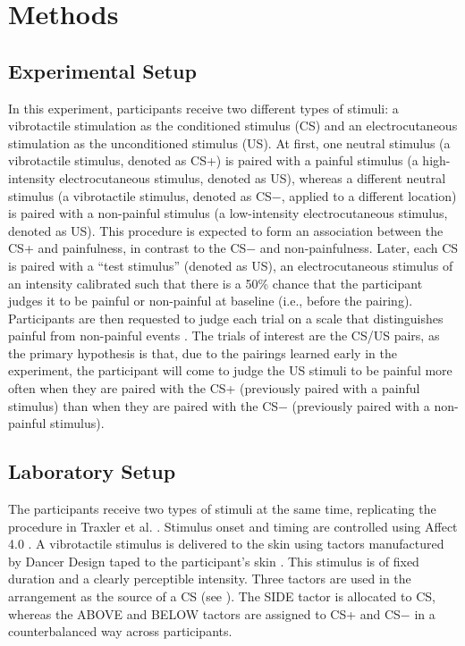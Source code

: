 \documentclass{jote-article}
\begin{document}
\section{Methods}

\subsection{Experimental Setup}

In this experiment, participants receive two different types of stimuli: a vibrotactile stimulation as the conditioned stimulus (CS) and an electrocutaneous stimulation as the unconditioned stimulus (US). At first, one neutral stimulus (a vibrotactile stimulus, denoted as CS+) is paired with a painful stimulus (a high-intensity electrocutaneous stimulus, denoted as US), whereas a different neutral stimulus (a vibrotactile stimulus, denoted as CS−, applied to a different location) is paired with a non-painful stimulus (a low-intensity electrocutaneous stimulus, denoted as US). This procedure is expected to form an association between the CS+ and painfulness, in contrast to the CS− and non-painfulness. Later, each CS is paired with a “test stimulus” (denoted as US), an electrocutaneous stimulus of an intensity calibrated such that there is a 50\% chance that the participant judges it to be painful or non-painful at baseline (i.e., before the pairing). Participants are then requested to judge each trial on a scale that distinguishes painful from non-painful events \cite{bibr40}. The trials of interest are the CS/US pairs, as the primary hypothesis is that, due to the pairings learned early in the experiment, the participant will come to judge the US stimuli to be painful more often when they are paired with the CS+ (previously paired with a painful stimulus) than when they are paired with the CS− (previously paired with a non-painful stimulus).

\subsection{Laboratory Setup}

The participants receive two types of stimuli at the same time, replicating the procedure in Traxler et al. \cite{bibr7}. Stimulus onset and timing are controlled using Affect 4.0 \cite{bibr41}. A vibrotactile stimulus is delivered to the skin using tactors manufactured by Dancer Design taped to the participant’s skin \cite{bibr42}. This stimulus is of fixed duration and a clearly perceptible intensity. Three tactors are used in the arrangement as the source of a CS (see ). The SIDE tactor is allocated to CS, whereas the ABOVE and BELOW tactors are assigned to CS+ and CS− in a counterbalanced way across participants.
\end{document}
